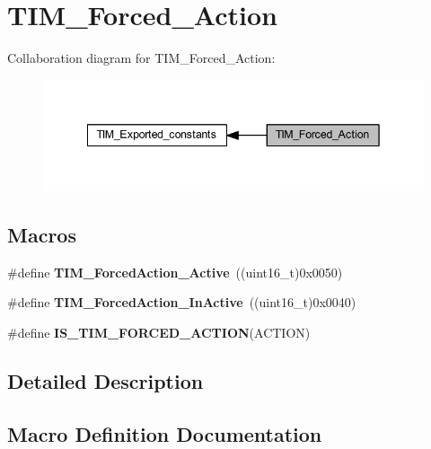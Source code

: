 \hypertarget{group___t_i_m___forced___action}{}\section{T\+I\+M\+\_\+\+Forced\+\_\+\+Action}
\label{group___t_i_m___forced___action}
Collaboration diagram for T\+I\+M\+\_\+\+Forced\+\_\+\+Action\+:
\nopagebreak
\begin{figure}[H]
\begin{center}
\leavevmode
\includegraphics[width=342pt]{group___t_i_m___forced___action}
\end{center}
\end{figure}
\subsection*{Macros}
\begin{DoxyCompactItemize}
\item 
\mbox{\label{group___t_i_m___forced___action_ga19d3769825f1dfdbdbde3edb60310b99}} 
\#define {\bfseries T\+I\+M\+\_\+\+Forced\+Action\+\_\+\+Active}~((uint16\+\_\+t)0x0050)
\item 
\mbox{\label{group___t_i_m___forced___action_ga79656f2193ec5e12a15d0ae5b025d273}} 
\#define {\bfseries T\+I\+M\+\_\+\+Forced\+Action\+\_\+\+In\+Active}~((uint16\+\_\+t)0x0040)
\item 
\#define {\bfseries I\+S\+\_\+\+T\+I\+M\+\_\+\+F\+O\+R\+C\+E\+D\+\_\+\+A\+C\+T\+I\+ON}(A\+C\+T\+I\+ON)
\end{DoxyCompactItemize}


\subsection{Detailed Description}


\subsection{Macro Definition Documentation}
\mbox{\label{group___t_i_m___forced___action_gaa2cb16f281d32c95ab974dc5157bfa63}} 
